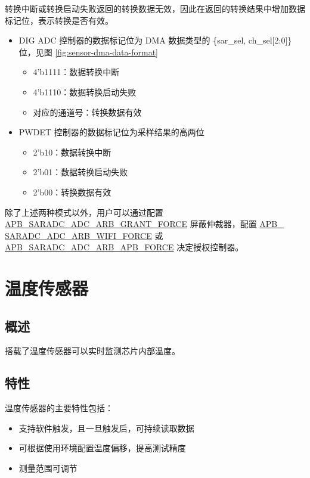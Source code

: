 \documentclass[main\_\_CN.tex]{subfiles}
\begin{document}
转换中断或转换启动失败返回的转换数据无效，因此在返回的转换结果中增加数据标记位，表示转换是否有效。

\begin{itemize}
    \item DIG ADC 控制器的数据标记位为 DMA 数据类型的 \{sar\_sel, ch\_sel[2:0]\} 位，见图 \ref{fig:sensor-dma-data-format}
    \begin{itemize}
        \item 4'b1111：数据转换中断
        \item 4'b1110：数据转换启动失败
        \item 对应的通道号：转换数据有效
    \end{itemize}
    \item PWDET 控制器的数据标记位为采样结果的高两位
    
    \begin{itemize}
        \item 2'b10：数据转换中断
        \item 2'b01：数据转换启动失败
        \item 2'b00：转换数据有效
    \end{itemize}
\end{itemize}
除了上述两种模式以外，用户可以通过配置 \hyperref[fielddesc:APBSARADCADCARBGRANTFORCE]{APB\_SARADC\_ADC\_ARB\_GRANT\_FORCE} 屏蔽仲裁器，配置 \hyperref[fielddesc:APBSARADCADCARBWIFIFORCE]{APB\_\\SARADC\_ADC\_ARB\_WIFI\_FORCE} 或 \hyperref[fielddesc:APBSARADCADCARBAPBFORCE]{APB\_SARADC\_ADC\_ARB\_APB\_FORCE} 决定授权控制器。

\section{温度传感器}\label{sec:sensor-temp-sensor}
\subsection{概述}
\chipname{} 搭载了温度传感器可以实时监测芯片内部温度。
\subsection{特性} 
温度传感器的主要特性包括：
\begin{itemize}
    \item 支持软件触发，且一旦触发后，可持续读取数据
    \item 可根据使用环境配置温度偏移，提高测试精度
    \item 测量范围可调节
\end{itemize}
\end{document}
